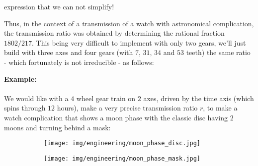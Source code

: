 	expression that we can not simplify!
	\begin{tcolorbox}[title=Remark,colframe=black,arc=10pt]
	Thus, in the context of a transmission of a watch with astronomical complication, the transmission ratio was obtained by determining the rational fraction $1802/217$. This being very difficult to implement with only two gears, we'll just build with three axes and four gears (with $7$, $31$, $34$ and $53$ teeth) the same ratio - which fortunately is not irreducible - as follows:
	
	\end{tcolorbox}
	\begin{tcolorbox}[colframe=black,colback=white,sharp corners]
	\textbf{{\Large {}}Example:}\\\\
	We would like with a $4$ wheel gear train on $2$ axes, driven by the time axis (which spins through $12$ hours), make a very precise transmission ratio $r$, to make a watch complication that shows a moon phase with the classic disc having $2$ moons and turning behind a mask:
	\begin{figure}[H]
		\centering
		\begin{subfigure}{0.4\textwidth}
			\texttt{[image: img/engineering/moon\_phase\_disc.jpg]}
		\end{subfigure}
		\begin{subfigure}{0.4\textwidth}
			\texttt{[image: img/engineering/moon\_phase\_mask.jpg]}
		\end{subfigure}				
	\end{figure}
	\end{tcolorbox}
	
